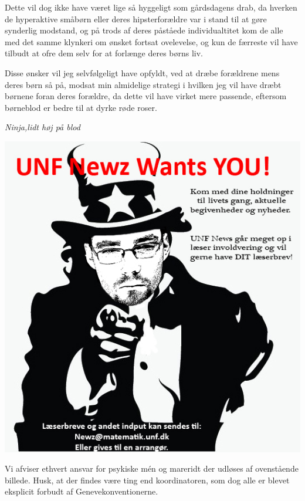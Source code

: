 \begin{minipage}[b]{0.95\linewidth}
\begin{minipage}[t]{0.47\textwidth}
Dette vil dog ikke have været lige så hyggeligt som gårdsdagens drab, da hverken de hyperaktive småbørn eller deres hipsterforældre var i stand til at gøre synderlig modstand, og på trods af deres påståede individualtitet kom de alle med det samme klynkeri om ønsket fortsat ovelevelse, og kun de færreste vil have tilbudt at ofre dem selv for at forlænge deres børns liv. 

Disse ønsker vil jeg selvfølgeligt have opfyldt, ved at dræbe forældrene mens deres børn så på, modsat min almidelige strategi i hvilken jeg vil have dræbt børnene foran deres forældre, da dette vil have virket mere passende, eftersom børneblod er bedre til at dyrke røde roser.

{\flushright\emph{Ninja,lidt høj på blod}}

\vspace{2mm}
\includegraphics[width=\linewidth]{wewantyou.jpg}

Vi afviser ethvert ansvar for psykiske mén og mareridt der udløses af ovenstående billede. Husk, at der findes være ting end koordinatoren, som dog alle er blevet eksplicit forbudt af Genevekonventionerne.


\end{minipage}
\end{minipage}
